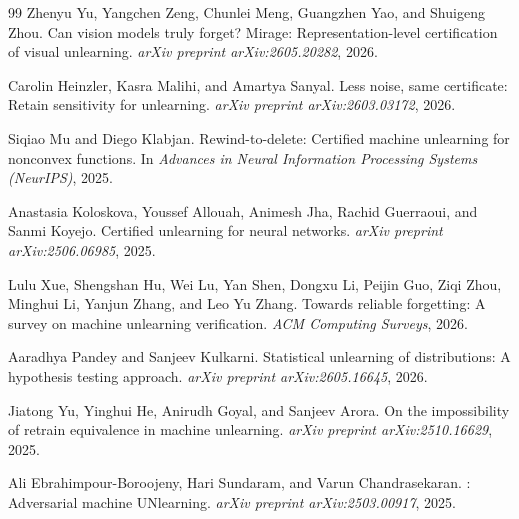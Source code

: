 \documentclass{article}
\begin{document}
\begin{thebibliography}{99}
Zhenyu Yu, Yangchen Zeng, Chunlei Meng, Guangzhen Yao, and Shuigeng Zhou.
\newblock Can vision models truly forget? {Mirage}: Representation-level certification of visual unlearning.
\newblock \emph{arXiv preprint arXiv:2605.20282}, 2026.

Carolin Heinzler, Kasra Malihi, and Amartya Sanyal.
\newblock Less noise, same certificate: Retain sensitivity for unlearning.
\newblock \emph{arXiv preprint arXiv:2603.03172}, 2026.

Siqiao Mu and Diego Klabjan.
\newblock Rewind-to-delete: Certified machine unlearning for nonconvex functions.
\newblock In \emph{Advances in Neural Information Processing Systems (NeurIPS)}, 2025.

Anastasia Koloskova, Youssef Allouah, Animesh Jha, Rachid Guerraoui, and Sanmi Koyejo.
\newblock Certified unlearning for neural networks.
\newblock \emph{arXiv preprint arXiv:2506.06985}, 2025.

Lulu Xue, Shengshan Hu, Wei Lu, Yan Shen, Dongxu Li, Peijin Guo, Ziqi Zhou, Minghui Li, Yanjun Zhang, and Leo Yu Zhang.
\newblock Towards reliable forgetting: A survey on machine unlearning verification.
\newblock \emph{ACM Computing Surveys}, 2026.

Aaradhya Pandey and Sanjeev Kulkarni.
\newblock Statistical unlearning of distributions: A hypothesis testing approach.
\newblock \emph{arXiv preprint arXiv:2605.16645}, 2026.

Jiatong Yu, Yinghui He, Anirudh Goyal, and Sanjeev Arora.
\newblock On the impossibility of retrain equivalence in machine unlearning.
\newblock \emph{arXiv preprint arXiv:2510.16629}, 2025.

Ali Ebrahimpour-Boroojeny, Hari Sundaram, and Varun Chandrasekaran.
: Adversarial machine UNlearning.
\newblock \emph{arXiv preprint arXiv:2503.00917}, 2025.

\end{thebibliography}
\end{document}
